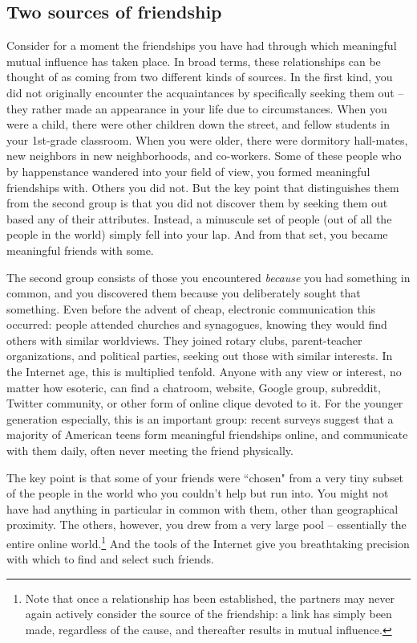 
\subsection{Two sources of friendship}

Consider for a moment the friendships you have had through which meaningful
mutual influence has taken place. In broad terms, these relationships can be
thought of as coming from two different kinds of sources. In the first kind,
you did not originally encounter the acquaintances by specifically seeking
them out -- they rather made an appearance in your life due to circumstances.
When you were a child, there were other children down the street, and fellow
students in your 1st-grade classroom. When you were older, there were
dormitory hall-mates, new neighbors in new neighborhoods, and co-workers. Some
of these people who by happenstance wandered into your field of view, you
formed meaningful friendships with. Others you did not. But the key point that
distinguishes them from the second group is that you did not discover them by
seeking them out based any of their attributes. Instead, a minuscule set of
people (out of all the people in the world) simply fell into your lap. And
from that set, you became meaningful friends with some.

The second group consists of those you encountered \textit{because} you had
something in common, and you discovered them because you deliberately sought
that something. Even before the advent of cheap, electronic communication this
occurred: people attended churches and synagogues, knowing they would find
others with similar worldviews. They joined rotary clubs, parent-teacher
organizations, and political parties, seeking out those with similar
interests. In the Internet age, this is multiplied tenfold. Anyone with any
view or interest, no matter how esoteric, can find a chatroom, website, Google
group, subreddit, Twitter community, or other form of online clique devoted to
it. For the younger generation especially, this is an important group: recent
surveys suggest that a majority of American teens form meaningful friendships
online, and communicate with them daily, often never meeting the friend
physically.\cite{amanda_lenhart_teens_2015}

The key point is that some of your friends were ``chosen" from a very tiny
subset of the people in the world who you couldn't help but run into. You
might not have had anything in particular in common with them, other than
geographical proximity. The others, however, you drew from a very large pool
-- essentially the entire online world.\footnote{Note that once a relationship
has been established, the partners may never again actively consider the
source of the friendship: a link has simply been made, regardless of the
cause, and thereafter results in mutual influence.} And the tools of the
Internet give you breathtaking precision with which to find and select such
friends.

